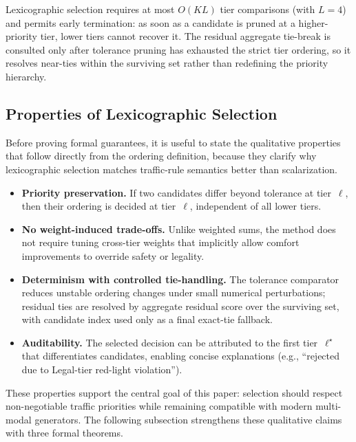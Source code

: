 Lexicographic selection requires at most $O(KL)$ tier comparisons (with $L{=}4$) and permits early termination: as soon as a candidate is pruned at a higher-priority tier, lower tiers cannot recover it.  The residual aggregate tie-break is consulted only after tolerance pruning has exhausted the strict tier ordering, so it resolves near-ties within the surviving set rather than redefining the priority hierarchy.

\subsection{Properties of Lexicographic Selection}
\label{subsec:properties}

Before proving formal guarantees, it is useful to state the qualitative properties that follow directly from the ordering definition, because they clarify why lexicographic selection matches traffic-rule semantics better than scalarization.

\begin{itemize}
\item \textbf{Priority preservation.}  If two candidates differ beyond tolerance at tier~$\ell$, then their ordering is decided at tier~$\ell$, independent of all lower tiers.

\item \textbf{No weight-induced trade-offs.}  Unlike weighted sums, the method does not require tuning cross-tier weights that implicitly allow comfort improvements to override safety or legality.

\item \textbf{Determinism with controlled tie-handling.}  The tolerance comparator reduces unstable ordering changes under small numerical perturbations; residual ties are resolved by aggregate residual score over the surviving set, with candidate index used only as a final exact-tie fallback.

\item \textbf{Auditability.}  The selected decision can be attributed to the first tier~$\ell^\star$ that differentiates candidates, enabling concise explanations (e.g., ``rejected due to Legal-tier red-light violation'').
\end{itemize}

\noindent
These properties support the central goal of this paper: selection should respect non-negotiable traffic priorities while remaining compatible with modern multi-modal generators.  The following subsection strengthens these qualitative claims with three formal theorems.


